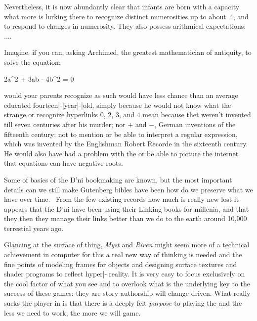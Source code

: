 \StopIdea

\StartIdea
    [ title={Brian Butterworth},
     remark={The Mathematical Brain, p. 162, 1999}]

Nevertheless, it is now abundantly clear that infants are born with a \remark
{capacity} {what more is lurking there} to recognize distinct numerosities up to
about~4, and to respond to changes in numerosity. They also possess arithmical
expectations: ....

\StopIdea

\StartIdea
    [ title={Brian Butterworth},
     remark={The Mathematical Brain, p. 275, 1999}]

Imagine, if you can, asking Archimed, the greatest mathematician of antiquity, to
solve the equation:

\startformula
2a^2 + 3ab - 4b^2 = 0
\stopformula

 {would your parents recognize  as such} would have
less chance than an average educated fourteen|-|year|-|old, simply because he
would not know what the strange  {or recognize hyperlinks} $0$,
$2$, $3$, and $4$ mean because thet weren't invented till seven centuries after
his murder; nor $+$ and $-$, German inventions of the fifteenth century; not to
mention \remark {$=$} {or be able to interpret a regular expression}, which was
invented by the Englishman Robert Recorde in the sixteenth century. He would also
have had a problem with the  {or be able to picture the internet}
that equations can have negative roots.

\StopIdea

\StartIdea
    [ title={Richard Kadrey},
     remark={From Myst to Riven, the Creations and Inspirations, p. 16, 1997}]

Some of basics of the D'ni bookmaking are known, but the most important \remark
{details} {can we still make Gutenberg bibles} have been  {how do
we preserve what we have} over time. \unknown\ From the few existing \remark
{records} {how much is really new} lost it appears that the D'ni have been using
their Linking books for millenia, and that they  {then they
manage their links better than we do} to the earth around 10,000 terrestial years
ago.

\StopIdea

\StartIdea
    [ title={Richard Kadrey},
     remark={From Myst to Riven, the Creations and Inspirations, p. 81,1997}]

Glancing at the surface of thing, {\em Myst} and {\em Riven} might seem more of a
technical achievement in computer  {for this a real new way of
thinking is needed} and the fine points of modeling frames for objects and
designing surface textures and shader programs to reflect hyper|-|reality. It is
very easy to focus exclusively on the cool factor of what you see and to overlook
what is the underlying key to the success of these games: they are \remark
{story} {authorship will change} driven. What really sucks the player in is that
there is a deeply felt {\em purpose} to playing the  {and the less
we need to work, the more we will game}.

